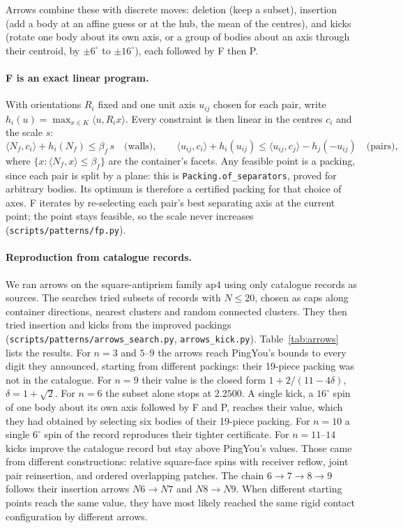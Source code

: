 \documentclass[11pt,a4paper]{article}
\newcommand{\code}[1]{\texttt{\nolinkurl{#1}}}
\newcommand{\lean}[1]{\texttt{#1}}
\theoremstyle{definition}
\theoremstyle{remark}
\begin{document}
Arrows combine these with discrete moves: deletion (keep a subset), insertion (add a body at an affine guess or at the hub, the mean of the centres), and kicks (rotate one body about its own axis, or a group of bodies about an axis through their centroid, by $\pm 6^\circ$ to $\pm 16^\circ$), each followed by F then P.

\paragraph{F is an exact linear program.} With orientations $R_i$ fixed and one unit axis $u_{ij}$ chosen for each pair, write $h_i(u)=\max_{x\in K}\langle u,R_i x\rangle$. Every constraint is then linear in the centres $c_i$ and the scale $s$:
\begin{equation}\label{eq:F}
\langle N_f,c_i\rangle+h_i(N_f)\le \beta_f\,s\quad\text{(walls)},\qquad
\langle u_{ij},c_i\rangle+h_i(u_{ij})\le \langle u_{ij},c_j\rangle-h_j(-u_{ij})\quad\text{(pairs)},
\end{equation}
where $\{x:\langle N_f,x\rangle\le\beta_f\}$ are the container's facets. Any feasible point is a packing, since each pair is split by a plane: this is \lean{Packing.of\_separators}, proved for arbitrary bodies. Its optimum is therefore a certified packing for that choice of axes. F iterates by re-selecting each pair's best separating axis at the current point; the point stays feasible, so the scale never increases (\code{scripts/patterns/fp.py}).

\paragraph{Reproduction from catalogue records.} We ran arrows on the square-antiprism family $\mathrm{ap4}$ using only catalogue records as sources. The searches tried subsets of records with $N\le20$, chosen as caps along container directions, nearest clusters and random connected clusters. They then tried insertion and kicks from the improved packings (\code{scripts/patterns/arrows\_search.py}, \code{arrows\_kick.py}). Table~\ref{tab:arrows} lists the results. For $n=3$ and $5$--$9$ the arrows reach PingYou's bounds to every digit they announced, starting from different packings: their 19-piece packing was not in the catalogue. For $n=9$ their value is the closed form $1+2/(11-4\delta)$, $\delta=1+\sqrt2$. For $n=6$ the subset alone stops at $2.2500$. A single kick, a $16^\circ$ spin of one body about its own axis followed by F and P, reaches their value, which they had obtained by selecting six bodies of their 19-piece packing. For $n=10$ a single $6^\circ$ spin of the record reproduces their tighter certificate. For $n=11$--$14$ kicks improve the catalogue record but stay above PingYou's values. Those came from different constructions: relative square-face spins with receiver reflow, joint pair reinsertion, and ordered overlapping patches. The chain $6\to7\to8\to9$ follows their insertion arrows $N6\to N7$ and $N8\to N9$. When different starting points reach the same value, they have most likely reached the same rigid contact configuration by different arrows.
\end{document}
